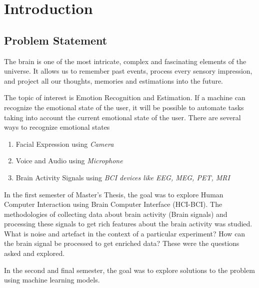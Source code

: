 
\chapter{Introduction} %

\label{Chapter 1} %



\section{Problem Statement}
The brain is one of the most intricate, complex and fascinating elements of the universe. It allows us to remember past events, process every sensory impression, and project all our thoughts, memories and estimations into the future.

The topic of interest is Emotion Recognition and Estimation. If a machine can recognize the emotional state of the user, it will be possible to automate tasks taking into account the current emotional state of the user. There are several ways to recognize emotional states
\begin{enumerate}
\item Facial Expression using \emph{Camera}
\item Voice and Audio using \emph{Microphone}
\item Brain Activity Signals using \emph{BCI devices like EEG, MEG, PET, MRI}
\end{enumerate}

In the first semester of Master's Thesis, the goal was to explore Human Computer Interaction using Brain Computer Interface (HCI-BCI). The methodologies of collecting data about brain activity (Brain signals) and processing these signals to get rich features about the brain activity was studied. What is noise and artefact in the context of a particular experiment? How can the brain signal be processed to get enriched data? These were the questions asked and explored.

In the second and final semester, the goal was to explore solutions to the problem using machine learning models. 

